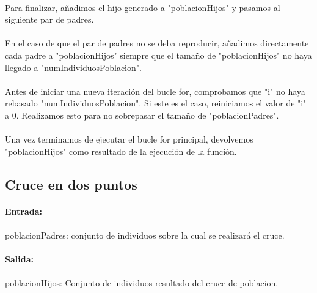 	\paragraph{}Para finalizar, añadimos el hijo generado a "poblacionHijos" y pasamos al siguiente par de padres.
	
	\paragraph{}En el caso de que el par de padres no se deba reproducir, añadimos directamente cada padre a "poblacionHijos" siempre que el tamaño de "poblacionHijos" no haya llegado a "numIndividuosPoblacion".
	
	\paragraph{}Antes de iniciar una nueva iteración del bucle for, comprobamos que "i" no haya rebasado "numIndividuosPoblacion". Si este es el caso, reiniciamos el valor de "i" a 0. Realizamos esto para no sobrepasar el tamaño de "poblacionPadres".
	
	\paragraph{}Una vez terminamos de ejecutar el bucle for principal, devolvemos "poblacionHijos" como resultado de la ejecución de la función.
	
	\subsection{Cruce en dos puntos}
	
	\paragraph{Entrada:}
	
	\paragraph{}poblacionPadres: conjunto de individuos sobre la cual se realizará el cruce.
	
	\paragraph{Salida:}
	
	\paragraph{}poblacionHijos: Conjunto de individuos resultado del cruce de poblacion.

